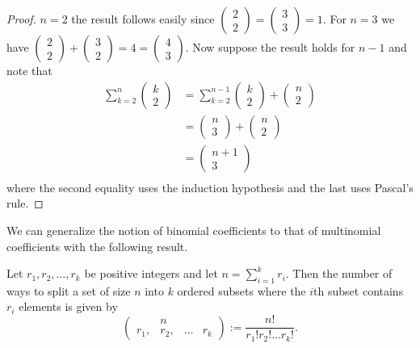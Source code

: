 \begin{proof}
$n=2$ the result follows easily since $\left(\begin{array}{c}
2\\
2
\end{array}\right)=\left(\begin{array}{c}
3\\
3
\end{array}\right)=1$. For $n=3$ we have $\left(\begin{array}{c}
2\\
2
\end{array}\right)+\left(\begin{array}{c}
3\\
2
\end{array}\right)=4=\left(\begin{array}{c}
4\\
3
\end{array}\right).$ Now suppose the result holds for $n-1$ and note that 
\begin{align*}
\sum_{k=2}^{n}\left(\begin{array}{c}
k\\
2
\end{array}\right) & =\sum_{k=2}^{n-1}\left(\begin{array}{c}
k\\
2
\end{array}\right)+\left(\begin{array}{c}
n\\
2
\end{array}\right)\\
 & =\left(\begin{array}{c}
n\\
3
\end{array}\right)+\left(\begin{array}{c}
n\\
2
\end{array}\right)\\
 & =\left(\begin{array}{c}
n+1\\
3
\end{array}\right)\\
\end{align*}
where the second equality uses the induction hypothesis and the last
uses Pascal's rule.
\end{proof}
We can generalize the notion of binomial coefficients to that of multinomial
coefficients with the following result.
\begin{prop}
\label{prop:multinomialCoefficients}Let $r_{1},r_{2},\ldots,r_{k}$
be positive integers and let $n=\sum_{i=1}^{k}r_{i}$. Then the number
of ways to split a set of size $n$ into $k$ ordered subsets where
the $i$th subset contains $r_{i}$ elements is given by
\[
\left(\begin{array}{cccc}
 & n\\
r_{1}, & r_{2}, & \ldots & r_{k}
\end{array}\right):=\frac{n!}{r_{1}!r_{2}!\ldots r_{k}!}.
\]
\end{prop}


